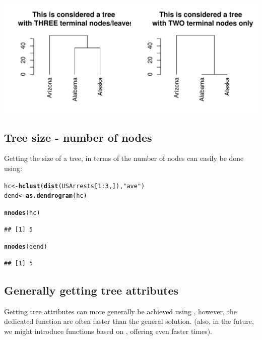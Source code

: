 \documentclass[shortnames,nojss,article]{jss}\usepackage{graphicx, color}
\makeatletter
\def\maxwidth{ %
  \ifdim\Gin@nat@width>\linewidth
    \linewidth
  \else
    \Gin@nat@width
  \fi
}
\newcommand{\hlfunctioncall}[1]{\textcolor[rgb]{0.501960784313725,0,0.329411764705882}{\textbf{#1}}}%
\newcommand{\hlstring}[1]{\textcolor[rgb]{0.6,0.6,1}{#1}}%
\newenvironment{kframe}{%
 \def\at@end@of@kframe{}%
 \ifinner\ifhmode%
  \def\at@end@of@kframe{\end{minipage}}%
  \begin{minipage}{\columnwidth}%
 \fi\fi%
 \def\FrameCommand##1{\hskip\@totalleftmargin \hskip-\fboxsep
 \colorbox{shadecolor}{##1}\hskip-\fboxsep
     \hskip-\linewidth \hskip-\@totalleftmargin \hskip\columnwidth}%
 \MakeFramed {\advance\hsize-\width
   \@totalleftmargin\z@ \linewidth\hsize
   \@setminipage}}%
 {\par\unskip\endMakeFramed%
 \at@end@of@kframe}
\newenvironment{knitrout}{}{} %
\makeatother
\begin{document}
\begin{knitrout}
{\centering \includegraphics[width=\maxwidth]{figure/unnamed-chunk-19} 

}



\end{knitrout}



\subsection{Tree size - number of nodes}

Getting the size of a tree, in terms of the number of nodes can easily be done using:

\begin{knitrout}
\color{fgcolor}\begin{kframe}
\begin{alltt}
hc <- \hlfunctioncall{hclust}(\hlfunctioncall{dist}(USArrests[1:3, ]), \hlstring{"ave"})
dend <- \hlfunctioncall{as.dendrogram}(hc)

\hlfunctioncall{nnodes}(hc)
\end{alltt}
\begin{verbatim}
## [1] 5
\end{verbatim}
\begin{alltt}
\hlfunctioncall{nnodes}(dend)
\end{alltt}
\begin{verbatim}
## [1] 5
\end{verbatim}
\end{kframe}
\end{knitrout}



\subsection{Generally getting tree attributes}

Getting tree attributes can more generally be achieved using , however, the dedicated function are often faster than the general solution. (also, in the future, we might introduce functions based on , offering even faster times).
\end{document}
